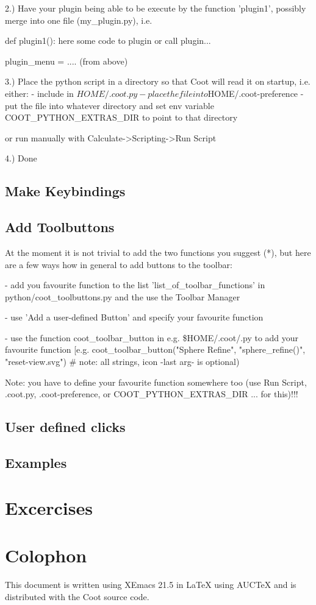 \documentclass{article}
\begin{document}
2.) Have your plugin being able to be execute by the function 'plugin1', 
possibly merge into one file (my\_plugin.py), i.e.

\begin{code}
def plugin1():
    here some code to plugin or call plugin...

plugin_menu = .... (from above)
\end{code}

3.) Place the python script in a directory so that Coot will read it on 
startup, i.e. either:
- include in $HOME/.coot.py
- place the file into $HOME/.coot-preference
- put the file into whatever directory and set env variable 
COOT\_PYTHON\_EXTRAS\_DIR to point to that directory

or run manually with Calculate->Scripting->Run Script

4.) Done

\subsection{Make Keybindings}

\subsection{Add Toolbuttons}
At the moment it is not trivial to add the two functions you suggest 
(*), but here are a few ways how in general to add buttons to the toolbar:

- add you favourite function to the list 'list\_of\_toolbar\_functions' in 
python/coot\_toolbuttons.py and the use the Toolbar Manager

- use 'Add a user-defined Button' and specify your favourite function

- use the function coot\_toolbar\_button in e.g. \$HOME/.coot/.py to add 
your favourite function [e.g. coot\_toolbar\_button("Sphere Refine", 
"sphere\_refine()", "reset-view.svg")  \# note: all strings, icon -last arg- is optional)

Note: you have to define your favourite function somewhere too (use Run 
Script, .coot.py, .coot-preference, or COOT\_PYTHON\_EXTRAS\_DIR ... for 
this)!!!


\subsection{User defined clicks}

\subsection{Examples}

\section{Excercises}



\section*{Colophon}

This document is written using XEmacs 21.5 in \LaTeX{} using AUC\TeX{}
and is distributed with the Coot source code.
\end{document}
